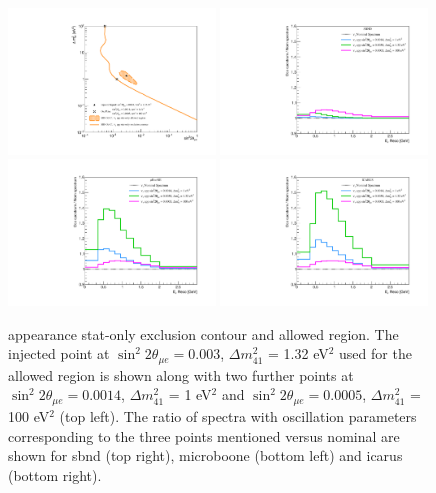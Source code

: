 \begin{figure}[h!]
    \centering
    \includegraphics[width = 0.49\textwidth, height = 0.47\textwidth]{figures-chap6/overlays/nue_app_stat_osc_markers.pdf}
    \includegraphics[width = 0.49\textwidth]{figures-chap6/spectra/nue_app_spectra_ratio_sbnd.pdf}
    \includegraphics[width = 0.49\textwidth]{figures-chap6/spectra/nue_app_spectra_ratio_uboone.pdf}
    \includegraphics[width = 0.49\textwidth]{figures-chap6/spectra/nue_app_spectra_ratio_icarus.pdf}
    \caption[Ratio of \nue appearance spectra with the oscillation parameters shown on the statistical only contour.]{\nue appearance stat-only exclusion contour and allowed region. The injected point at $\sin^2{2\theta_{\mu e}} = 0.003$, $\Delta m^2_{41}$ = 1.32 eV$^2$ used for the allowed region is shown along with two further points at $\sin^2{2\theta_{\mu e}} = 0.0014$, $\Delta m^2_{41}$ = 1 eV$^2$ and   $\sin^2{2\theta_{\mu e}} = 0.0005$, $\Delta m^2_{41}$ = 100 eV$^2$ (top left). The ratio of spectra with oscillation parameters corresponding to the three points mentioned versus nominal are shown for \gls{sbnd} (top right), \gls{microboone} (bottom left) and \gls{icarus} (bottom right).}
    \label{fig:Nue_app_spectra_ratios}
\end{figure}


